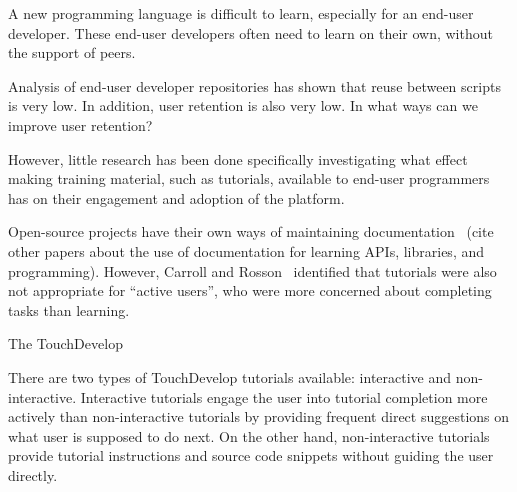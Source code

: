  A new programming language is difficult to learn, especially for an end-user developer. These end-user developers often need to learn on their own, without the support of peers.

Analysis of end-user developer repositories
\cite{athreya2012:touchdevelop,bogart2008:coscripter,sihan2013:touchdevelop,stolee2013:yahoopipes} has shown that reuse between scripts is very low. In addition, user retention is also very low. In what ways can we improve user retention? 

However, little research has been done specifically investigating what effect making training material, such as tutorials, available to end-user programmers has on their engagement and adoption of the platform.

Open-source projects have their own ways of maintaining documentation~\cite{dagenais2010} (cite other papers about the use of documentation for learning APIs, libraries, and programming). However, Carroll and Rosson~\cite{carroll_paradox_1987} identified that tutorials were also not appropriate for ``active users'', who were more concerned about completing tasks than learning.

The TouchDevelop 



There are two types of TouchDevelop tutorials available: interactive and non-interactive. Interactive tutorials engage the user into tutorial completion more actively than non-interactive tutorials by providing frequent direct suggestions on what user is supposed to do next. On the other hand, non-interactive tutorials provide tutorial instructions and source code snippets without guiding the user directly.
